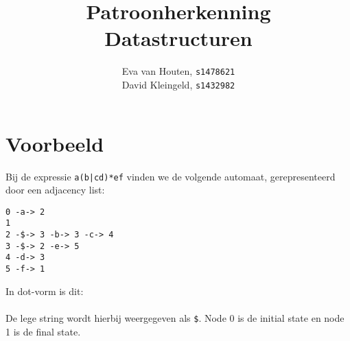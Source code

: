 \documentclass{article}
\title{\textbf{Patroonherkenning}\\ Datastructuren}
\author{Eva van Houten, \texttt{s1478621}\\
        David Kleingeld, \texttt{s1432982}}
\begin{document}
\maketitle

\section*{Voorbeeld}
Bij de expressie \verb;a(b|cd)*ef; vinden we de volgende automaat, gerepresenteerd door een adjacency list:
\begin{verbatim}
0 -a-> 2
1
2 -$-> 3 -b-> 3 -c-> 4
3 -$-> 2 -e-> 5
4 -d-> 3
5 -f-> 1
\end{verbatim}
In dot-vorm is dit:\\
\\
De lege string wordt hierbij weergegeven als \verb;$;. Node 0 is de initial state en node 1 is de final state.
\end{document}
